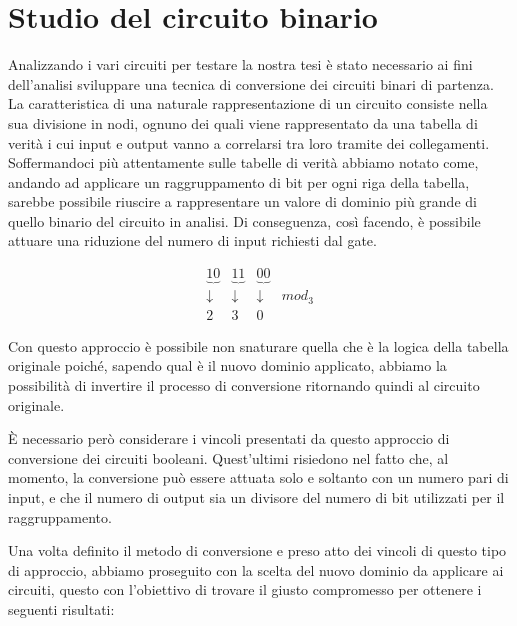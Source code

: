 \documentclass[italian,]{book}
\begin{document}
\newpage

\hypertarget{studio-del-circuito-binario}{%
\section{Studio del circuito binario}\label{studio-del-circuito-binario}}

Analizzando i vari circuiti per testare la nostra tesi è stato necessario ai fini dell'analisi sviluppare una tecnica di conversione dei circuiti binari di partenza. La caratteristica di una naturale rappresentazione di un circuito consiste nella sua divisione in nodi, ognuno dei quali viene rappresentato da una tabella di verità i cui input e output vanno a correlarsi tra loro tramite dei collegamenti. Soffermandoci più attentamente sulle tabelle di verità abbiamo notato come, andando ad applicare un raggruppamento di bit per ogni riga della tabella, sarebbe possibile riuscire a rappresentare un valore di dominio più grande di quello binario del circuito in analisi. Di conseguenza, così facendo, è possibile attuare una riduzione del numero di input richiesti dal gate.

\[\begin{matrix}
    \underbrace{10} & \underbrace{11} & \underbrace{00} \\
    \downarrow & \downarrow & \downarrow  &mod_3 \\
    2 & 3 & 0
\end{matrix}\]

Con questo approccio è possibile non snaturare quella che è la logica della tabella originale poiché, sapendo qual è il nuovo dominio applicato, abbiamo la possibilità di invertire il processo di conversione ritornando quindi al circuito originale.

È necessario però considerare i vincoli presentati da questo approccio di conversione dei circuiti booleani. Quest'ultimi risiedono nel fatto che, al momento, la conversione può essere attuata solo e soltanto con un numero pari di input, e che il numero di output sia un divisore del numero di bit utilizzati per il raggruppamento.

\newpage

Una volta definito il metodo di conversione e preso atto dei vincoli di questo tipo di approccio, abbiamo proseguito con la scelta del nuovo dominio da applicare ai circuiti, questo con l'obiettivo di trovare il giusto compromesso per ottenere i seguenti risultati:
\end{document}
